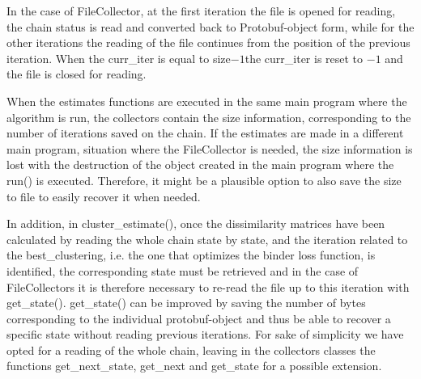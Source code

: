 In the case of FileCollector, at the first iteration the file is opened for reading, the chain status is read and converted back to Protobuf-object form, while for the other iterations the reading of the file continues from the position of the previous iteration. When the curr\_iter is equal to size$-1$the curr\_iter is reset to $-1$ and the file is closed for reading.

When the estimates functions are executed in the same main program where the algorithm is run, the collectors contain the size information, corresponding to the number of iterations saved on the chain. 
If the estimates are made in a different main program, situation where the FileCollector is needed, the size information is lost with the destruction of the object created in the main program where the run() is executed. Therefore, it might be a plausible option to also save the size to file to easily recover it when needed. 

In addition, in cluster\_estimate(),  once the dissimilarity matrices have been calculated by reading the whole chain state by state, and the iteration related to the best\_clustering, i.e. the one that optimizes the binder loss function, is identified, the corresponding state must be retrieved and in the case of FileCollectors it is therefore necessary to re-read the file up to this iteration with get\_state(). get\_state() can be improved by saving the number of bytes corresponding to the individual protobuf-object and thus be able to recover a specific state without reading previous iterations. For sake of simplicity we have opted for a reading of the whole chain, leaving in the collectors classes the functions get\_next\_state, get\_next and get\_state for a possible extension.